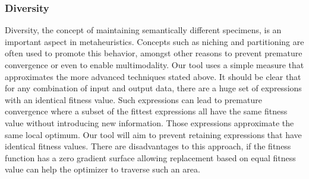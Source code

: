 \subsubsection{Diversity}\label{subsubdiversity}
Diversity, the concept of maintaining semantically different specimens, is an important aspect in metaheuristics. Concepts such as niching and partitioning are often used to promote this behavior, amongst other reasons to prevent premature convergence or even to enable multimodality.
Our tool uses a simple measure that approximates the more advanced techniques stated above. It should be clear that for any combination of input and output data, there are a huge set of expressions with an identical fitness value. Such expressions can lead to premature convergence where a subset of the fittest expressions all have the same fitness value without introducing new information. Those expressions approximate the same local optimum. Our tool will aim to prevent retaining expressions that have identical fitness values.
There are disadvantages to this approach, if the fitness function has a zero gradient surface allowing replacement based on equal fitness value can help the optimizer to traverse such an area.

